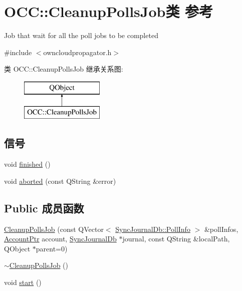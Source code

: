 \hypertarget{class_o_c_c_1_1_cleanup_polls_job}{}\section{O\+CC\+:\+:Cleanup\+Polls\+Job类 参考}
\label{class_o_c_c_1_1_cleanup_polls_job}


Job that wait for all the poll jobs to be completed  




{\ttfamily \#include $<$owncloudpropagator.\+h$>$}

类 O\+CC\+:\+:Cleanup\+Polls\+Job 继承关系图\+:\begin{figure}[H]
\begin{center}
\leavevmode
\includegraphics[height=2.000000cm]{class_o_c_c_1_1_cleanup_polls_job}
\end{center}
\end{figure}
\subsection*{信号}
\begin{DoxyCompactItemize}
\item 
void \hyperlink{class_o_c_c_1_1_cleanup_polls_job_ad6e089fb43c1896e22867cfffb011363}{finished} ()
\item 
void \hyperlink{class_o_c_c_1_1_cleanup_polls_job_add22249d8b202739247de8287cc7dc60}{aborted} (const Q\+String \&error)
\end{DoxyCompactItemize}
\subsection*{Public 成员函数}
\begin{DoxyCompactItemize}
\item 
\hyperlink{class_o_c_c_1_1_cleanup_polls_job_a7c5e8ccb57d86ddf3bedf8759565a6a5}{Cleanup\+Polls\+Job} (const Q\+Vector$<$ \hyperlink{struct_o_c_c_1_1_sync_journal_db_1_1_poll_info}{Sync\+Journal\+Db\+::\+Poll\+Info} $>$ \&poll\+Infos, \hyperlink{namespace_o_c_c_a848616aedb9188e223c6b9867757fe69}{Account\+Ptr} account, \hyperlink{class_o_c_c_1_1_sync_journal_db}{Sync\+Journal\+Db} $\ast$journal, const Q\+String \&local\+Path, Q\+Object $\ast$parent=0)
\item 
\hyperlink{class_o_c_c_1_1_cleanup_polls_job_ab2f79c25bd90b80e79254d93069c3387}{$\sim$\+Cleanup\+Polls\+Job} ()
\item 
void \hyperlink{class_o_c_c_1_1_cleanup_polls_job_aa2a5050d296eb47434ad9627f162e8aa}{start} ()
\end{DoxyCompactItemize}


